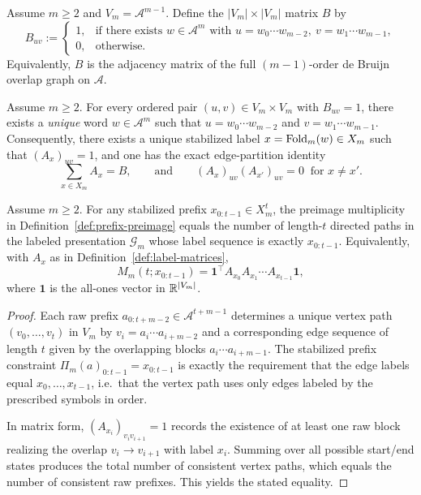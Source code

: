 \begin{definition}\label{def:debruijn-matrix}
Assume $m\ge 2$ and $V_m=\mathcal{A}^{m-1}$. Define the $|V_m|\times |V_m|$ matrix $B$ by
\[
B_{uv}:=
\begin{cases}
1,& \text{if there exists }w\in\mathcal{A}^m \text{ with }u=w_0\cdots w_{m-2},\ v=w_1\cdots w_{m-1},\\
0,& \text{otherwise.}
\end{cases}
\]
Equivalently, $B$ is the adjacency matrix of the full $(m\!-\!1)$-order de Bruijn overlap graph on $\mathcal{A}$.
\end{definition}

\begin{proposition}\label{prop:label-partition}
Assume $m\ge 2$. For every ordered pair $(u,v)\in V_m\times V_m$ with $B_{uv}=1$, there exists a \emph{unique} word $w\in\mathcal{A}^m$ such that $u=w_0\cdots w_{m-2}$ and $v=w_1\cdots w_{m-1}$. Consequently, there exists a unique stabilized label $x=\mathrm{Fold}_m(w)\in X_m$ such that $(A_x)_{uv}=1$, and one has the exact edge-partition identity
\[
\sum_{x\in X_m} A_x = B,
\qquad
\text{and}\qquad
(A_x)_{uv}(A_{x'})_{uv}=0\ \text{ for }x\neq x'.
\]
\end{proposition}

\begin{proposition}\label{prop:preimage-as-pathcount}
Assume $m\ge 2$. For any stabilized prefix $x_{0:t-1}\in X_m^t$, the preimage multiplicity in Definition~\ref{def:prefix-preimage} equals the number of length-$t$ directed paths in the labeled presentation $\mathcal{G}_m$ whose label sequence is exactly $x_{0:t-1}$. Equivalently, with $A_{x}$ as in Definition~\ref{def:label-matrices},
\[
M_m(t;x_{0:t-1})=\mathbf{1}^\top A_{x_0}A_{x_1}\cdots A_{x_{t-1}}\mathbf{1},
\]
where $\mathbf{1}$ is the all-ones vector in $\mathbb{R}^{|V_m|}$.
\end{proposition}

\begin{proof}
Each raw prefix $a_{0:t+m-2}\in\mathcal{A}^{t+m-1}$ determines a unique vertex path $(v_0,\dots,v_t)$ in $V_m$ by $v_i=a_i\cdots a_{i+m-2}$ and a corresponding edge sequence of length $t$ given by the overlapping blocks $a_i\cdots a_{i+m-1}$. The stabilized prefix constraint $\Pi_m(a)_{0:t-1}=x_{0:t-1}$ is exactly the requirement that the edge labels equal $x_0,\dots,x_{t-1}$, i.e.\ that the vertex path uses only edges labeled by the prescribed symbols in order.

In matrix form, $(A_{x_i})_{v_i v_{i+1}}=1$ records the existence of at least one raw block realizing the overlap $v_i\to v_{i+1}$ with label $x_i$. Summing over all possible start/end states produces the total number of consistent vertex paths, which equals the number of consistent raw prefixes. This yields the stated equality.
\end{proof}

